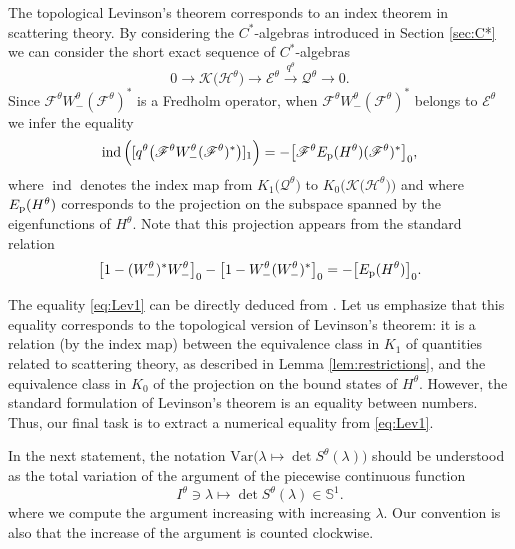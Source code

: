 \documentclass[11pt]{article}
\def\EE{\mathscr E}
\def\F{\mathscr F}
\def\Hrond{\mathscr H}
\def\K{\mathscr K}
\def\QQ{\mathcal Q}
\def\S{\mathbb S}
\def\Var{\mathrm{Var}}
\def\ind{\mathop{\mathrm{ind}}\nolimits}
\begin{document}
The topological Levinson's theorem corresponds to an index theorem in scattering theory.
By considering the $C^*$-algebras introduced in Section \ref{sec:C*} we can consider the short
exact sequence of $C^*$-algebras
$$
0 \longrightarrow \K\big(\Hrond^\theta\big)\longrightarrow \EE^\theta \stackrel{q^\theta}{\longrightarrow}  \QQ^\theta \longrightarrow 0.
$$
Since $\F^\theta W_-^\theta(\F^\theta)^*$ is a Fredholm operator, when $\F^\theta W_-^\theta(\F^\theta)^*$ belongs to $\EE^\theta$
we infer the equality
\begin{equation}\label{eq:Lev1}
\ind\Big([q^\theta \big(\F^\theta W_-^\theta(\F^\theta)^*\big)]_1\Big)  
=-\big[\F^\theta E_{\rm p}(H^\theta)(\F^\theta)^*\big]_0,
\end{equation}
where $\ind$ denotes the index map from $K_1\big(\QQ^\theta\big)$ to $K_0\big( \K\big(\Hrond^\theta\big)\big)$ and where $E_{\rm p}(H^\theta)$ corresponds to the projection on the subspace spanned by the eigenfunctions of $H^\theta$.
Note that this projection appears from the standard relation 
$$
\big[1-(W^\theta_-)^* W_-^\theta\big]_0-\big[1-W_-^\theta (W_-^\theta)^*\big]_0 
=-\big[E_{\rm p}(H^\theta)\big]_0.
$$

The equality \eqref{eq:Lev1} can be directly deduced from \cite[Prop.~4.3]{Ri}.
Let us emphasize that this equality corresponds to the topological version of Levinson's theorem: it is a relation (by the index map) between the equivalence class in $K_1$
of quantities related to scattering theory, as described in Lemma \ref{lem:restrictions}, and the equivalence class in $K_0$ of the projection on the bound states of $H^\theta$. 
However, the standard formulation of Levinson's theorem is an equality between numbers. 
Thus, our final task is to extract a numerical equality from \eqref{eq:Lev1}.

In the next statement, the notation 
$\Var \big(\lambda \mapsto \det S^\theta(\lambda)\big)$ 
should be understood as  the total variation of the argument of the piecewise continuous function 
\begin{equation*}
I^\theta \ni \lambda \mapsto \det S^\theta(\lambda) \in \S^1.
\end{equation*}
where we compute the argument increasing with increasing $\lambda$. Our convention is also that the increase of the argument is counted clockwise.
\end{document}
